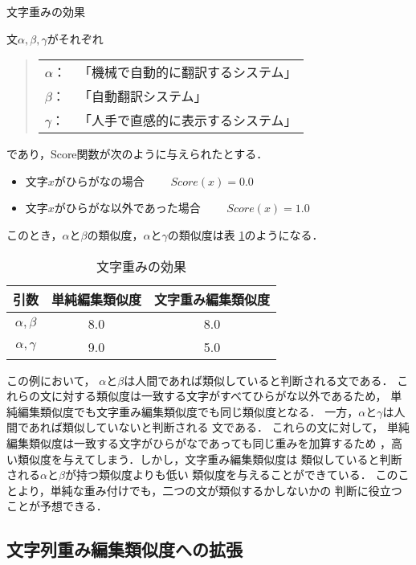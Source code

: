 \begin{ex} 文字重みの効果

文$\alpha, \beta, \gamma$がそれぞれ
\begin{quote}
  \begin{tabular}{ll}
   $\alpha$： & 「機械で自動的に翻訳するシステム」 \\
   $\beta$：  & 「自動翻訳システム」 \\
   $\gamma$： & 「人手で直感的に表示するシステム」 \\
  \end{tabular}
\end{quote}
であり，Score関数が次のように与えられたとする．
\begin{itemize}
 \item 文字$x$がひらがなの場合~~~~
	   $ Score(x)=0.0 $
 \item 文字$x$がひらがな以外であった場合~~~~
	   $ Score(x)=1.0 $
\end{itemize}
このとき，$\alpha$と$\beta$の類似度，$\alpha$と$\gamma$の類似度は表
 \ref{tab:character-weight}のようになる．
\begin{table}[htbp]
\caption{文字重みの効果}
\label{tab:character-weight}
\begin{center}
  \vspace{-1em}
  \begin{tabular}{|c||c|c|}\hline
    引数 & 単純編集類似度 & 文字重み編集類似度\\\hline\hline
    $\alpha,\beta$  &  8.0   &   8.0  \\\hline
    $\alpha,\gamma$ &  9.0   &   5.0  \\\hline
  \end{tabular}
 \end{center}
\end{table}
\label{ex:weight}
\end{ex}
この例において，
$\alpha$と$\beta$は人間であれば類似していると判断される文である．
これらの文に対する類似度は一致する文字がすべてひらがな以外であるため，
単純編集類似度でも文字重み編集類似度でも同じ類似度となる．
一方，$\alpha$と$\gamma$は人間であれば類似していないと判断される
文である．
これらの文に対して，
単純編集類似度は一致する文字がひらがなであっても同じ重みを加算するため
，高い類似度を与えてしまう．しかし，文字重み編集類似度は
類似していると判断される$\alpha$と$\beta$が持つ類似度よりも低い
類似度を与えることができている．
このことより，単純な重み付けでも，二つの文が類似するかしないかの
判断に役立つことが予想できる．

\subsection{文字列重み編集類似度への拡張} \label{sim3}

